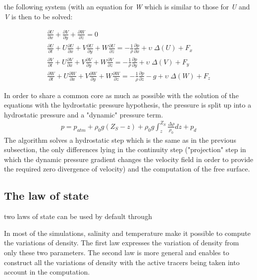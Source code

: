 the following system (with an equation for \textit{W} which is similar to those
for \textit{U} and \textit{V} is then to be solved:

\begin{subequations}
\begin{align}
\frac{\partial U}{\partial x} +\frac{\partial V}{\partial
y} +\frac{\partial W}{\partial z} = 0
\\
\frac{\partial U}{\partial t}
+U\frac{\partial U}{\partial x} +V\frac{\partial U}{\partial y}
+W\frac{\partial U}{\partial z} =-\frac{1}{\rho } \frac{\partial p}{\partial x}
+\upsilon \; \Delta \left(U\right)+F_{x}
\\
\frac{\partial V}{\partial t}
+U\frac{\partial V}{\partial x} +V\frac{\partial V}{\partial y}
+W\frac{\partial V}{\partial z} =-\frac{1}{\rho } \frac{\partial p}{\partial y}
+\upsilon \; \Delta \left(V\right)+F_{y}
\\
\frac{\partial W}{\partial t}
+U\frac{\partial W}{\partial x} +V\frac{\partial W}{\partial y}
+W\frac{\partial W}{\partial z} =-\frac{1}{\rho } \frac{\partial p}{\partial z}
-g+\upsilon \; \Delta \left(W\right)+F_{z}
\end{align}
\end{subequations}

In order to share a common core as much as possible with the solution of the
equations with the hydrostatic pressure hypothesis, the pressure is split up
into a hydrostatic pressure and a "dynamic" pressure term.
\begin{align}
p=p_{atm} +\rho _{0} g\left(Z_{S} -z\right)+\rho _{0} g\int _{z}^{Z_{S}
}\frac{\Delta \rho }{\rho _{0} } dz +p_{d}
\end{align}
The  algorithm solves a hydrostatic step which is the same as in the
previous subsection, the only differences lying in the continuity step
("projection" step in which the dynamic pressure gradient changes the velocity
field in order to provide the required zero divergence of velocity) and the
computation of the free surface.

\subsection{The law of state}

two laws of state can be used by default through 

In most of the simulations, salinity and temperature make it possible to
compute the variations of density. The first law expresses the variation of
density from only these two parameters. The second law is more general and
enables to construct all the variations of density with the active tracers
being taken into account in the computation.

